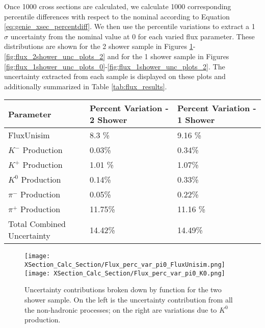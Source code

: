 Once 1000 cross sections are calculated, we calculate 1000 corresponding percentile differences with respect to the nominal according to Equation \ref{eq:genie_xsec_percentdiff}. We then use the percentile variations to extract a 1 $\sigma$ uncertainty from the nominal value at 0 for each varied flux parameter.  These distributions are shown for the 2 shower sample in Figures \ref{fig:flux_2shower_unc_plots_0}-\ref{fig:flux_2shower_unc_plots_2} and for the 1 shower sample in Figures \ref{fig:flux_1shower_unc_plots_0}-\ref{fig:flux_1shower_unc_plots_2}. The uncertainty extracted from each sample is displayed on these plots and additionally summarized in Table \ref{tab:flux_results}.  


 \begin{table}[H]
 \centering
  \begin{tabular}{| l | l | l |}
  \hline
   Parameter & Percent Variation - 2 Shower & Percent Variation - 1 Shower  \\ [0.1ex] \hline
 FluxUnisim & 8.3 \% & 9.16 \%  \\
 $K^-$ Production & 0.03\% & 0.34\%\\
 $K^+$ Production &  1.01 \% & 1.07\% \\
 $K^0$ Production & 0.14\% & 0.33\% \\
 $\pi^-$ Production & 0.05\% & 0.22\%\\
 $\pi^+$ Production &  11.75\% & 11.16 \% \\ \hline
 Total Combined Uncertainty & 14.42\% & 14.49\%\\ \hline
\end{tabular}
\end{table}

\begin{figure}[h!]
\centering
\texttt{[image: XSection\_Calc\_Section/Flux\_perc\_var\_pi0\_FluxUnisim.png]}
\texttt{[image: XSection\_Calc\_Section/Flux\_perc\_var\_pi0\_K0.png]}
\caption{ Uncertainty contributions broken down by function for the two shower sample. On the left is the uncertainty contribution from all the non-hadronic processes; on the right are variations due to $K^0$ production. }
\label{fig:flux_2shower_unc_plots_0}
\end{figure}

